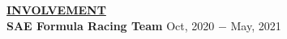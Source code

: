 \documentclass{article}
\begin{document}
\noindent \textbf{\underline{INVOLVEMENT}} \\
\noindent \textbf{SAE Formula Racing Team} \hfill Oct, 2020 $-$ May, 2021

\end{document}
